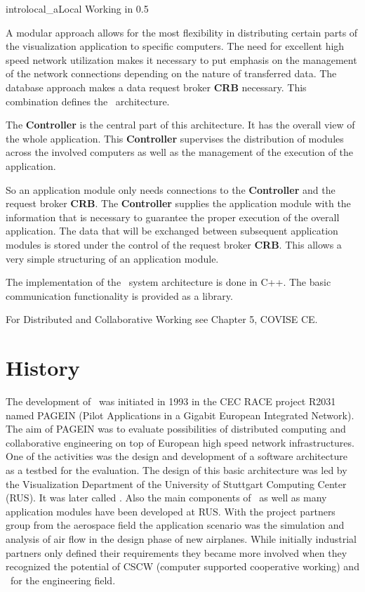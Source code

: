 \begin{covimg}{intro}{local_a}{Local Working in \covise}{0.5}\end{covimg}
    
A modular approach allows for the most flexibility in distributing certain 
parts of the visualization application to specific computers. The need for excellent 
high speed network utilization makes it necessary to put emphasis on the management 
of the network connections depending on the nature of transferred data.
The database approach makes a data request broker {\bf CRB} necessary.
This combination defines the \covise\ architecture.

The {\bf Controller} is the central part of this architecture. It has the overall view of the 
whole application. This  {\bf Controller} supervises the distribution of modules 
across the involved computers as well as the management of the execution of the 
application.


So an application module only needs 
connections to the {\bf Controller} and the request broker {\bf CRB}. The {\bf Controller} supplies the 
application module with the information that is necessary to guarantee the proper 
execution of the overall application. The data that will be exchanged between subsequent 
application modules is stored under the control of the request 
broker {\bf CRB}. This allows a very simple structuring of an application module.

The implementation of the \covise\ system architecture is done in C++. The basic 
communication functionality is provided as a library. 

For Distributed and Collaborative Working see Chapter 5, COVISE CE.


\section{History}

 The development of \covise\ was initiated in 1993 in the CEC RACE project R2031 named PAGEIN (Pilot
 Applications in a Gigabit European Integrated Network). The aim of PAGEIN was to evaluate possibilities of
 distributed computing and collaborative engineering on top of European high speed network infrastructures.
 One of the activities was the design and development of a software architecture as a testbed for the
 evaluation. The design of this basic architecture was led by the Visualization Department of the University of
 Stuttgart Computing Center (RUS). It was later called \covise. Also the main components of \covise\ as well
 as many application modules have been developed at RUS. With the project partners group from the
 aerospace field the application scenario was the simulation and analysis of air flow in the design phase of
 new airplanes. While initially industrial partners only defined their requirements they became more involved
 when they recognized the potential of CSCW (computer supported cooperative working) and \covise\ for the
 engineering field. 

